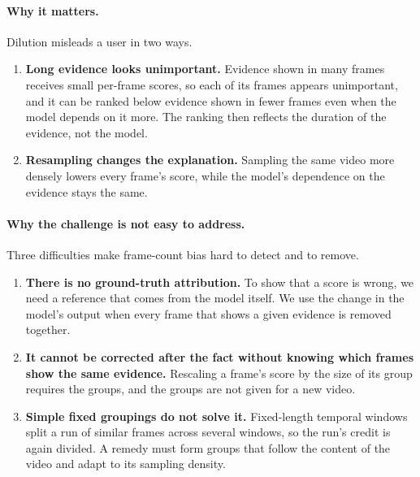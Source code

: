 \paragraph{Why it matters.}
Dilution misleads a user in two ways.
\begin{enumerate}
  \item \textbf{Long evidence looks unimportant.} Evidence shown in many frames receives small per-frame scores, so each of its frames appears unimportant, and it can be ranked below evidence shown in fewer frames even when the model depends on it more. The ranking then reflects the duration of the evidence, not the model.
  \item \textbf{Resampling changes the explanation.} Sampling the same video more densely lowers every frame's score, while the model's dependence on the evidence stays the same.
\end{enumerate}

\paragraph{Why the challenge is not easy to address.}
Three difficulties make frame-count bias hard to detect and to remove.
\begin{enumerate}
  \item \textbf{There is no ground-truth attribution.} To show that a score is wrong, we need a reference that comes from the model itself. We use the change in the model's output when every frame that shows a given evidence is removed together.
  \item \textbf{It cannot be corrected after the fact without knowing which frames show the same evidence.} Rescaling a frame's score by the size of its group requires the groups, and the groups are not given for a new video.
  \item \textbf{Simple fixed groupings do not solve it.} Fixed-length temporal windows split a run of similar frames across several windows, so the run's credit is again divided. A remedy must form groups that follow the content of the video and adapt to its sampling density.
\end{enumerate}

